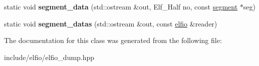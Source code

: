 \begin{DoxyCompactItemize}
\item 
static void {\bfseries segment\+\_\+data} (std\+::ostream \&out, Elf\+\_\+\+Half no, const \hyperlink{class_e_l_f_i_o_1_1segment}{segment} $\ast$seg)\hypertarget{class_e_l_f_i_o_1_1dump_a3185bd59b2f1eadd79528beb99baa4d6}{}\label{class_e_l_f_i_o_1_1dump_a3185bd59b2f1eadd79528beb99baa4d6}

\item 
static void {\bfseries segment\+\_\+datas} (std\+::ostream \&out, const \hyperlink{class_e_l_f_i_o_1_1elfio}{elfio} \&reader)\hypertarget{class_e_l_f_i_o_1_1dump_a057132b6114ffffe9cf5266307727af1}{}\label{class_e_l_f_i_o_1_1dump_a057132b6114ffffe9cf5266307727af1}

\end{DoxyCompactItemize}


The documentation for this class was generated from the following file\+:\begin{DoxyCompactItemize}
\item 
include/elfio/elfio\+\_\+dump.\+hpp\end{DoxyCompactItemize}
